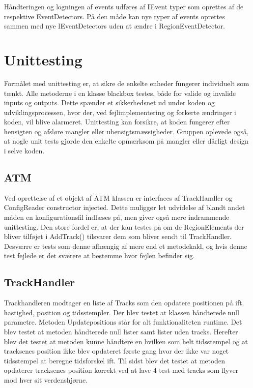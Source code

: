 Håndteringen og logningen af events udføres af IEvent typer som oprettes af de respektive EventDetectors. På den måde kan nye typer af events oprettes sammen med nye IEventDetectors uden at ændre i RegionEventDetector.

\section{Unittesting}
Formålet med unittesting er, at sikre de enkelte enheder fungerer individuelt som tænkt. Alle metoderne i en klasse blackbox testes, både for valide og invalide inputs og outputs. Dette spænder et sikkerhedsnet ud under koden og udviklingsprocessen, hvor der, ved fejlimplementering og forkerte ændringer i koden, vil blive alarmeret. Unittesting kan forsikre, at koden fungerer efter hensigten og afsløre mangler eller uhensigtsmæssigheder. Gruppen oplevede også, at nogle unit tests gjorde den enkelte opmærksom på mangler eller dårligt design i selve koden.

\subsection{ATM}
Ved oprettelse af et objekt af ATM klassen er interfaces af TrackHandler og ConfigReader constructor injected. Dette muliggør let udvidelse af blandt andet måden en konfigurationsfil indlæses på, men giver også mere indrammende unittesting. Den store fordel er, at der kan testes på om de RegionElements der bliver tilføjet i AddTrack() tilsvarer dem som bliver sendt til TrackHandler. Desværre er tests som denne afhængig af mere end et metodekald, og hvis denne test fejlede er det sværere at bestemme hvor fejlen befinder sig.

\subsection{TrackHandler}
Trackhandleren modtager en liste af Tracks som den opdatere positionen på ift. hastighed, position og tidsstempler. Der blev testet at klassen håndterede null parametre. Metoden Updatepositions står for alt funktionaliteten runtime. Det blev testet at metoden håndterede null lister samt lister uden tracks. Herefter blev det testet at metoden kunne håndtere en hvilken som helt tidsstempel og at tracksenes position ikke blev opdateret første gang hvor der ikke var noget tidsstempel at beregne tidsforskel ift. Til sidst blev det testet at metoden opdaterer tracksenes position korrekt ved at lave 4 test med tracks som flyver mod hver sit verdenshjørne.

